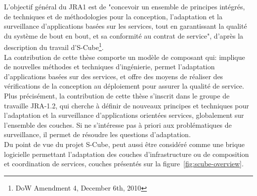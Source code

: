 L'objectif général du JRA1 est de "concevoir un ensemble de principes intégrés, de techniques et de méthodologies pour la conception, l'adaptation et la surveillance d'applications basées sur les services, tout en garantissant la qualité du système de bout en bout, et sa conformité au contrat de service", d'après la description du travail d'S-Cube\footnote{DoW Amendment 4, December 6th, 2010}.\\
La contribution de cette thèse comporte un modèle de composant qui: implique de nouvelles méthodes et techniques d'ingénierie, permet l'adaptation d'applications basées sur des services, et offre des moyens de réaliser des vérifications de la conception au déploiement pour assurer la qualité de service.\\

Plus précisément, la contribution de cette thèse s'inscrit dans le groupe de travaille JRA-1.2, qui cherche à définir de nouveaux principes et techniques pour l'adaptation et la surveillance d'applications orientées services, globalement sur l'ensemble des couches. Si \enti{} ne s'intéresse pas à priori aux problématiques de surveillance, il permet de résoudre les questions d'adaptation.\\

Du point de vue du projet S-Cube, \enti{} peut aussi être considéré comme une brique logicielle permettant l'adaptation des couches d'infrastructure ou de composition et coordination de services, couches présentés sur la figure~\ref{fig:scube-overview}. 



